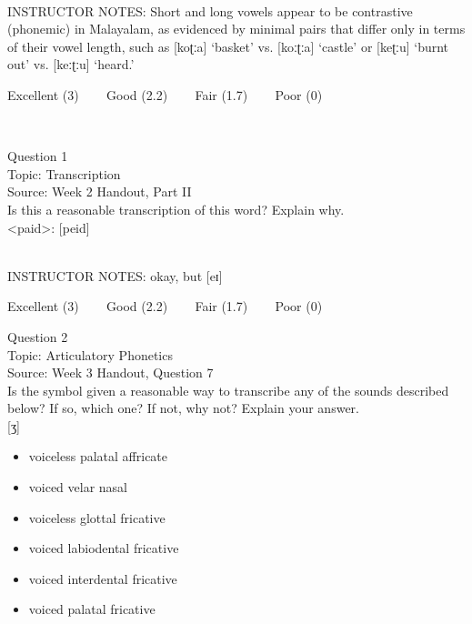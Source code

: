 \documentclass[12pt]{article}
\begin{document}
~\\
INSTRUCTOR NOTES: Short and long vowels appear to be contrastive (phonemic) in Malayalam, as evidenced by minimal pairs that differ only in terms of their vowel length, such as [koʈːa] ‘basket’ vs. [koːʈːa] ‘castle’ or [keʈːu] ‘burnt out’ vs. [keːʈːu] ‘heard.’


\vfill
Excellent (3) ~~~ Good (2.2) ~~~ Fair (1.7) ~~~ Poor (0)
\newpage

\begin{center}
\textbf{{\color{red}{\HUGE END OF EXAM}}}\\

\end{center}
\newpage

\begin{center}
\textbf{{\color{blue}{\HUGE START OF EXAM\\}}}

\textbf{{\color{blue}{\HUGE Student ID: 29164\\}}}

\textbf{{\color{blue}{\HUGE \\}}}

\end{center}
\newpage

{\large Question 1}\\

Topic: Transcription\\
Source: Week 2 Handout, Part II\\

Is this a reasonable transcription of this word? Explain why.\\

<paid>: {[peid]}


~\\
INSTRUCTOR NOTES: okay, but [eɪ]


\vfill
Excellent (3) ~~~ Good (2.2) ~~~ Fair (1.7) ~~~ Poor (0)
\newpage

{\large Question 2}\\

Topic: Articulatory Phonetics\\
Source: Week 3 Handout, Question 7\\

Is the symbol given a reasonable way to transcribe any of the sounds described below? If so, which one? If not, why not? Explain your answer.\\

{[ʒ]}

\begin{itemize} \item voiceless palatal affricate \item voiced velar nasal \item voiceless glottal fricative \item voiced labiodental fricative \item voiced interdental fricative \item voiced palatal fricative \end{itemize}
\end{document}
